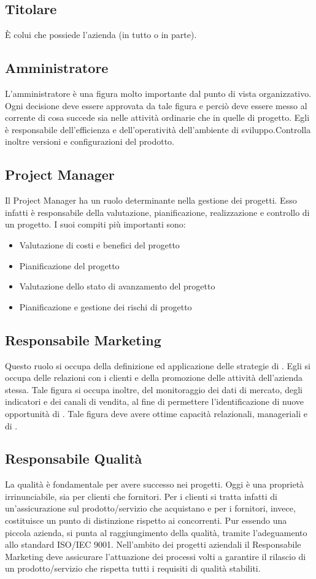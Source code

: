 	\subsection{Titolare}
	È colui che possiede l'azienda (in tutto o in parte).
	\subsection{Amministratore}		
	L'amministratore è una figura molto importante dal punto di vista organizzativo. Ogni decisione deve essere approvata da 	tale figura e perciò deve essere messo al corrente di cosa succede sia nelle attività ordinarie che in quelle di progetto.
	Egli è responsabile dell'efficienza e dell'operatività dell'ambiente di sviluppo.Controlla inoltre versioni e configurazioni del prodotto.
	\subsection{Project Manager}
	Il Project Manager ha un ruolo determinante nella gestione dei progetti. Esso infatti è responsabile della valutazione, pianificazione, realizzazione e controllo di un progetto.
	I suoi compiti più importanti sono:
	\begin{itemize}
		\item Valutazione di costi e benefici del progetto
		\item Pianificazione del progetto
		\item Valutazione dello stato di avanzamento del progetto
		\item Pianificazione e gestione dei rischi di progetto
	\end{itemize}

\subsection{Responsabile Marketing}
	Questo ruolo si occupa della definizione ed applicazione delle strategie di . Egli si occupa delle relazioni con i clienti e della promozione delle attività dell'azienda stessa. Tale figura si occupa inoltre, del monitoraggio dei dati di mercato, degli indicatori e dei canali di vendita, al fine di permettere l'identificazione di nuove opportunità di . Tale figura deve avere ottime capacità relazionali, manageriali e di . 




\subsection{Responsabile Qualità}	
	La qualità è fondamentale per avere successo nei progetti. Oggi è una proprietà irrinunciabile, sia per clienti che fornitori. Per i clienti si tratta infatti di un'assicurazione sul prodotto/servizio che acquistano e per i fornitori, invece, costituisce  un punto di distinzione rispetto ai concorrenti.
Pur essendo una piccola azienda, si punta al raggiungimento della qualità, tramite l'adeguamento allo standard ISO/IEC 9001.
Nell'ambito dei progetti aziendali il Responsabile Marketing deve assicurare l'attuazione dei processi volti a garantire il rilascio di un prodotto/servizio che rispetta tutti i requisiti di qualità stabiliti.
	 
